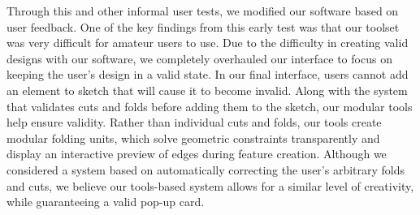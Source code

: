 Through this and other informal user tests, we modified our software
based on user feedback. One of the key findings from this early test was
that our toolset was very difficult for amateur users to use. Due to the
difficulty in creating valid designs with our software, we completely
overhauled our interface to focus on keeping the user's design in a
valid state. In our final interface, users cannot add an element to
sketch that will cause it to become invalid. Along with the system that
validates cuts and folds before adding them to the sketch, our modular
tools help ensure validity. Rather than individual cuts and folds, our
tools create modular folding units, which solve geometric constraints
transparently and display an interactive preview of edges during feature
creation. Although we considered a system based on automatically
correcting the user's arbitrary folds and cuts, we believe our
tools-based system allows for a similar level of creativity, while
guaranteeing a valid pop-up card.
